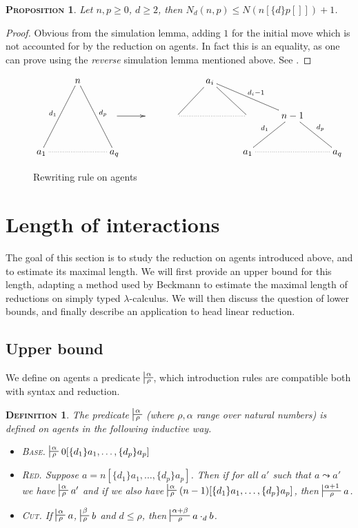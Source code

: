 \documentclass{article}
\newtheorem{definition}{\textsc{Definition}}
\newtheorem{proposition}{\textsc{Proposition}}
\begin{document}
\begin{proposition}
Let $n, p\geq 0$, $d\geq 2$, then $N_d(n,p) \leq N(n[\{d\}p[]])+1$.
\label{equiv}
\end{proposition}
\begin{proof}
Obvious from the simulation lemma, adding $1$ for the initial move which is not accounted for by the reduction on agents. In fact this is an equality, as one can prove using the \emph{reverse} simulation
lemma mentioned above. See \cite{phd}.
\end{proof}

\begin{figure}
\[
\xymatrix{
&n\ar@{-}[ddr]^{d_p}
  \ar@{-}[ddl]_{d_1}&&&&a_i\ar@{-}[dl]
                    \ar@{-}[dr]
                \ar@{-}[drr]^{d_i-1}\\
                &&\ar[r]&&\ar@{.}[rr]&&&n-1
                                        \ar@{-}[dr]^{d_p}
                                        \ar@{-}[dl]_{d_1}\\
a_1\ar@{.}[rr]&&a_q&&&&a_1\ar@{.}[rr]&&a_q
}
\]
\caption{Rewriting rule on agents}
\label{rewrite}
\end{figure}

\section{Length of interactions}

The goal of this section is to study the reduction on agents introduced above, and to estimate its maximal length. We will first provide an upper bound for this length, adapting a 
method used by Beckmann \cite{beckmann2001exact} to estimate the maximal length of reductions on simply typed $\lambda$-calculus. We will then discuss the question of lower bounds, and finally
describe an application to head linear reduction.

\subsection{Upper bound}

We define on agents a predicate $\sststile{\rho}{\alpha}$, which introduction rules are compatible both with syntax and reduction.

\begin{definition}
The predicate $\sststile{\rho}{\alpha}$ (where $\rho, \alpha$ range over natural numbers) is defined on agents in the following inductive way.
\begin{itemize}
\item \textsc{Base.} $\sststile{\rho}{\alpha} 0[\{d_1\} a_1, \dots, \{d_p\} a_p]$
\item \textsc{Red.} Suppose $a = n[\{d_1\}a_1, \dots, \{d_p\} a_p]$. Then if for all $a'$ such that $a\leadsto a'$ we have $\sststile{\rho}{\alpha} a'$ and if
we also have $\sststile{\rho}{\alpha}(n-1)[\{d_1\}a_1, \dots, \{d_p\} a_p]$, then $\sststile{\rho}{\alpha+1} a$.
\item \textsc{Cut.} If $\sststile{\rho}{\alpha} a$, $\sststile{\rho}{\beta} b$ and $d\leq \rho$, then $\sststile{\rho}{\alpha+\beta} a \cdot_d b$.
\end{itemize}
\end{definition}
\end{document}
